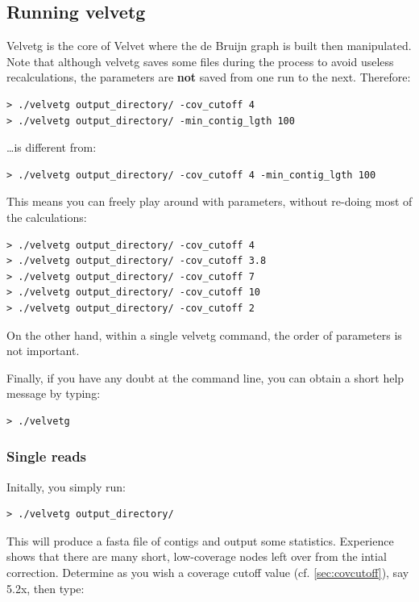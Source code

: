\documentclass{article}
\begin{document}
\subsection{Running velvetg}

Velvetg is the core of Velvet where the de Bruijn graph is built then manipulated. Note that although velvetg saves some files during the process to avoid useless recalculations, the parameters are \textbf{not} saved from one run to the next. Therefore:

\begin{verbatim}
> ./velvetg output_directory/ -cov_cutoff 4
> ./velvetg output_directory/ -min_contig_lgth 100
\end{verbatim}

\ldots is different from:

\begin{verbatim}
> ./velvetg output_directory/ -cov_cutoff 4 -min_contig_lgth 100
\end{verbatim}

This means you can freely play around with parameters, without re-doing most of the calculations:

\begin{verbatim}
> ./velvetg output_directory/ -cov_cutoff 4
> ./velvetg output_directory/ -cov_cutoff 3.8
> ./velvetg output_directory/ -cov_cutoff 7
> ./velvetg output_directory/ -cov_cutoff 10
> ./velvetg output_directory/ -cov_cutoff 2
\end{verbatim}

On the other hand, within a single velvetg command, the order of parameters is not important.

Finally, if you have any doubt at the command line, you can obtain a short help message by typing:

\begin{verbatim}
> ./velvetg
\end{verbatim}

	\subsubsection{Single reads}
	
	\label{sec:velvetg}

Initally, you simply run: 
\begin{verbatim}
> ./velvetg output_directory/
\end{verbatim}

This will produce a fasta file of contigs and output some statistics.
Experience shows that there are many short, low-coverage nodes left over from the intial correction. Determine as you wish a coverage cutoff value (cf. \ref{sec:covcutoff}), say 5.2x, then type:
\end{document}
